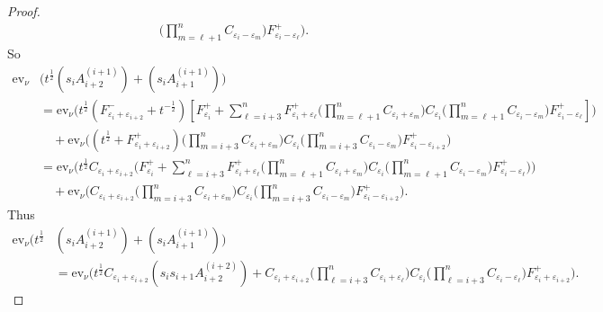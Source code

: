 \documentclass[11pt]{article}
\theoremstyle{plain}
\theoremstyle{definition}
\theoremstyle{remark}
\numberwithin{equation}{section}
\def\ev{\mathrm{ev}}
\newcounter{r}
\newcounter{s}
\begin{document}
\begin{proof}
\begin{align*}
\Big(\prod_{m=\ell+1}^n C_{\varepsilon_i-\varepsilon_m}\Big)
F^+_{\varepsilon_i-\varepsilon_\ell}\Big).
\end{align*}
So
\begin{align*}
\ev_\nu &\Big(t^{\frac12} (s_iA^{(i+1)}_{i+2}) + (s_iA^{(i+1)}_{i+1}) \Big)
\\
&= \ev_\nu\Big(t^{\frac12}(F_{\varepsilon_i + \varepsilon_{i+2}}^-+t^{-\frac12})
\left[
F_{\varepsilon_i}^+ 
+ \sum_{\ell=i+3}^n F^+_{\varepsilon_i+\varepsilon_\ell}
\Big(\prod_{m=\ell+1}^n C_{\varepsilon_i+\varepsilon_m}\Big) C_{\varepsilon_i}
\Big(\prod_{m=\ell+1}^n C_{\varepsilon_i-\varepsilon_m}\Big)
F^+_{\varepsilon_i-\varepsilon_\ell} \right]\Big)
\\
&\quad
+\ev_\nu\Big( (t^{\frac12}+F^+_{\varepsilon_i+\varepsilon_{i+2}})
\Big(\prod_{m=i+3}^n C_{\varepsilon_i+\varepsilon_m}\Big) C_{\varepsilon_i}
\Big(\prod_{m=i+3}^n C_{\varepsilon_i-\varepsilon_m}\Big)
F^+_{\varepsilon_i-\varepsilon_{i+2}} \Big)
\\
&= \ev_\nu\Big( t^{\frac12}C_{\varepsilon_i + \varepsilon_{i+2}}
\Big(
F_{\varepsilon_i}^+ 
+ \sum_{\ell=i+3}^n F^+_{\varepsilon_i+\varepsilon_\ell}
\Big(\prod_{m=\ell+1}^n C_{\varepsilon_i+\varepsilon_m}\Big) C_{\varepsilon_i}
\Big(\prod_{m=\ell+1}^n C_{\varepsilon_i-\varepsilon_m}\Big)
F^+_{\varepsilon_i-\varepsilon_\ell} \Big) \Big)
\\
&\quad
+ \ev_\nu\Big(C_{\varepsilon_i+\varepsilon_{i+2}}
\Big(\prod_{m=i+3}^n C_{\varepsilon_i+\varepsilon_m}\Big) C_{\varepsilon_i}
\Big(\prod_{m=i+3}^n C_{\varepsilon_i-\varepsilon_m}\Big)
F^+_{\varepsilon_i-\varepsilon_{i+2}} \Big).
\end{align*}
Thus
\begin{align}
\ev_\nu\Big(t^{\frac12} &(s_iA^{(i+1)}_{i+2}) + (s_iA^{(i+1)}_{i+1}) \Big)
\label{ST2}
\\
&= \ev_\nu\Big(t^{\frac12} C_{\varepsilon_i+\varepsilon_{i+2}}(s_is_{i+1}A^{(i+2)}_{i+2})
+ C_{\varepsilon_i+\varepsilon_{i+2}} \Big(\prod_{\ell=i+3}^n C_{\varepsilon_i+\varepsilon_\ell}\Big)
C_{\varepsilon_i}
\Big(\prod_{\ell=i+3}^n C_{\varepsilon_i-\varepsilon_\ell}\Big)
F^+_{\varepsilon_i+\varepsilon_{i+2}}\Big).
\nonumber
\end{align}


\end{proof}
\end{document}
